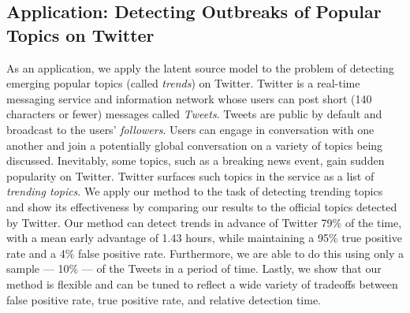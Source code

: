 \subsection{Application: Detecting Outbreaks of Popular Topics on Twitter}
As an application, we apply the latent source model to the problem of detecting
emerging popular topics (called {\em trends}) on Twitter. Twitter is a real-time
messaging service and information network whose users can post short (140
characters or fewer) messages called {\em Tweets}. Tweets are public by default
and broadcast to the users' {\em followers}. Users can engage in conversation
with one another and join a potentially global conversation on a variety of
topics being discussed. Inevitably, some topics, such as a breaking news event,
gain sudden popularity on Twitter. Twitter surfaces such topics in the service
as a list of {\em trending topics}. We apply our method to the task of detecting
trending topics and show its effectiveness by comparing our results to the
official topics detected by Twitter. Our method can detect trends in advance of
Twitter 79\% of the time, with a mean early advantage of 1.43 hours, while
maintaining a 95\% true positive rate and a 4\% false positive
rate. Furthermore, we are able to do this using only a sample --- 10\% --- of
the Tweets in a period of time. Lastly, we show that our method is flexible and
can be tuned to reflect a wide variety of tradeoffs between false positive rate,
true positive rate, and relative detection time.
